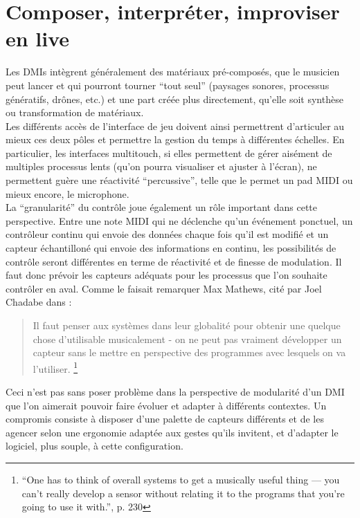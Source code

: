 \section{Composer, interpréter, improviser en live}

\noindent Les \glspl{DMI} intègrent généralement des matériaux pré-composés, que le musicien peut lancer et qui pourront tourner ``tout seul'' (paysages sonores, processus génératifs, drônes, etc.) et une part créée plus directement, qu'elle soit synthèse ou transformation de matériaux.\\
\indent Les différents accès de l'interface de jeu doivent ainsi permettrent d'articuler au mieux ces deux pôles et permettre la gestion du temps à différentes échelles. En particulier, les interfaces multitouch, si elles permettent de gérer aisément de multiples processus lents (qu'on pourra visualiser et ajuster à l'écran), ne permettent guère une réactivité ``percussive'', telle que le permet un pad \gls{MIDI} ou mieux encore, le microphone.\\
\indent La ``granularité'' du contrôle joue également un rôle important dans cette perspective. Entre une note \gls{MIDI} qui ne déclenche qu'un événement ponctuel, un contrôleur continu qui envoie des données chaque fois qu'il est modifié et un capteur échantilloné qui envoie des informations en continu, les possibilités de contrôle seront différentes en terme de réactivité et de finesse de modulation. Il faut donc prévoir les capteurs adéquats pour les processus que l'on souhaite contrôler en aval. Comme le faisait remarquer Max Mathews, cité par Joel Chadabe dans \cite{chadabe_electric_1996}:
\begin{quotation}
	Il faut penser aux systèmes dans leur globalité pour obtenir une quelque chose d'utilisable musicalement - on ne peut pas vraiment développer un capteur sans le mettre en perspective des programmes avec lesquels on va l'utiliser. \footnote{``One has to think of overall systems to get a musically useful thing — you can't really develop a sensor without relating it to the programs that you're going to use it with.'', p. 230}
\end{quotation}
\noindent Ceci n'est pas sans poser problème dans la perspective de modularité d'un \gls{DMI} que l'on aimerait pouvoir faire évoluer et adapter à différents contextes. Un compromis consiste à disposer d'une palette de capteurs différents et de les agencer selon une ergonomie adaptée aux gestes qu'ils invitent, et d'adapter le logiciel, plus souple, à cette configuration.

